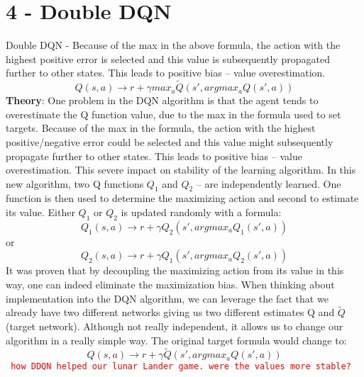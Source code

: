 \documentclass[12pt]{article}
\begin{document}
\section*{4 - Double DQN }
Double DQN - Because of the max in the above formula, the action with the highest positive error is selected and this value is subsequently propagated further to other states. This leads to positive bias – value overestimation.
\begin{equation}
Q(s,a) \rightarrow r + \gamma max_{a} \tilde{Q}(s', argmax_{a}Q(s', a))
\end{equation}
\textbf{Theory}: One problem in the DQN algorithm is that the agent tends to overestimate the Q function value, due to the max in the formula used to set targets.
Because of the max in the formula, the action with the highest positive/negative error could be selected and this value might subsequently propagate further to other states. This leads to positive bias – value overestimation. This severe impact on stability of the learning algorithm.
\newline
In this new algorithm, two Q functions $Q_{1}$ and $Q_2$ – are independently learned. One function is then used to determine the maximizing action and second to estimate its value. Either $Q_1$ or $Q_2$ is updated randomly with a formula:
\begin{equation}
Q_1(s, a) \xrightarrow{} r + \gamma Q_2(s', argmax_a Q_1(s', a)) 
\end{equation}
or
\begin{equation}
Q_2(s, a) \xrightarrow{} r + \gamma Q_1(s', argmax_a Q_2(s', a)) 
\end{equation}
It was proven that by decoupling the maximizing action from its value in this way, one can indeed eliminate the maximization bias.
\newline
When thinking about implementation into the DQN algorithm, we can leverage the fact that we already have two different networks giving us two different estimates Q and $\tilde{Q}$ (target network). Although not really independent, it allows us to change our algorithm in a really simple way.
\newline
The original target formula would change to:
\begin{equation}
Q(s, a) \xrightarrow{} r + \gamma \tilde{Q}(s', argmax_a Q(s', a))
\end{equation}
 \textcolor{red}{\texttt{ how DDQN helped our lunar Lander game. were the values more stable?}}
 
\end{document}
